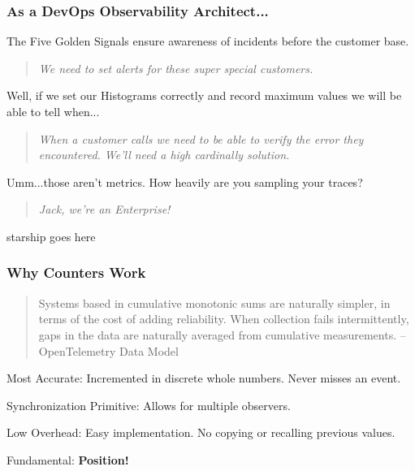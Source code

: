 \begin{frame}
    \frametitle{As a DevOps Observability Architect...}

    The  Five Golden Signals ensure awareness of incidents
    before the customer base.

    \pause
    \begin{quote}
        \emph{We need to set alerts for these super special customers.}
    \end{quote}

    Well, if we set our Histograms correctly and record maximum values we will
    be able to tell when...

    \pause
    \begin{quote}
        \emph{When a customer calls we need to be able to verify the error
            they encountered.  We'll need a high cardinally solution.}
    \end{quote}

    Umm...those aren't metrics.  How heavily are you sampling your traces?

    \pause
    \begin{quote}
        \emph{Jack, we're an Enterprise!}
    \end{quote}
\end{frame}

\begin{frame}
    starship goes here
\end{frame}



\begin{frame}
    \frametitle{Why Counters Work}

    \begin{quote}
         Systems based in cumulative monotonic sums are naturally simpler, in
         terms of the cost of adding reliability. When collection fails
         intermittently, gaps in the data are naturally averaged from
         cumulative measurements.  -- OpenTelemetry Data Model
    \end{quote}

    Most Accurate: Incremented in discrete whole numbers.  Never misses an
    event.

    Synchronization Primitive: Allows for multiple observers.

    Low Overhead: Easy implementation.  No copying or recalling previous
    values.

    Fundamental: \textbf{Position!}

\end{frame}

